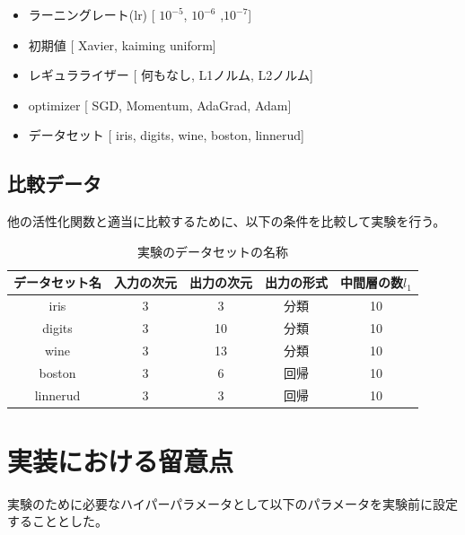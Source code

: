 \begin{itemize}
    \setlength{\parskip}{0cm} %
    \setlength{\itemsep}{0cm} %
    \item ラーニングレート(lr) [ $10^{-5}$, $10^{-6}$ ,$10^{-7}$]
    \item 初期値 [ Xavier, kaiming uniform]
    \item レギュラライザー [ 何もなし, L1ノルム, L2ノルム]
    \item optimizer [ SGD, Momentum, AdaGrad, Adam]
    \item データセット [ iris, digits, wine, boston, linnerud]
\end{itemize}



\subsection{比較データ}

他の活性化関数と適当に比較するために、以下の条件を比較して実験を行う。


\begin{table}[htbp]
    \begin{center}
        \caption{実験のデータセットの名称}
        \vspace{5mm} 
        \begin{tabular}{ |c|c|c|c|c| }
        データセット名 & 入力の次元 & 出力の次元 & 出力の形式 & 中間層の数$ {l_1} $\\
        \hline
        iris         & 3         & 3        & 分類      & 10 \\
        digits       & 3         & 10       & 分類      & 10 \\
        wine        & 3         & 13       & 分類      & 10 \\
        boston       & 3         & 6        & 回帰      & 10 \\
        linnerud     & 3         & 3        & 回帰      & 10 \\
        \end{tabular}
    \end{center}
\end{table}


\section{実装における留意点}
実験のために必要なハイパーパラメータとして以下のパラメータを実験前に設定することとした。

